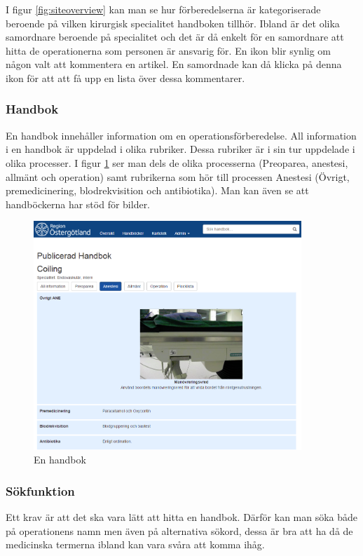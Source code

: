 I figur \ref{fig:siteoverview} kan man se hur förberedelserna är kategoriserade beroende på vilken kirurgisk specialitet handboken tillhör.
Ibland är det olika samordnare beroende på specialitet och det är då enkelt för en samordnare att hitta de operationerna som personen är ansvarig för.
En ikon blir synlig om någon valt att kommentera en artikel. En samordnade kan då klicka på denna ikon för att att få upp en lista över dessa kommentarer.

\subsubsection{Handbok}
En handbok innehåller information om en operationsförberedelse. All information i en handbok är uppdelad i olika rubriker. Dessa rubriker är i sin tur uppdelade i olika processer.
I figur \ref{fig:handbok} ser man dels de olika processerna (Preoparea, anestesi, allmänt och operation) samt rubrikerna som hör till processen Anestesi (Övrigt, premedicinering, blodrekvisition och  antibiotika). Man kan även se att handböckerna har stöd för bilder.

\begin{figure}[H]
  \centering
  \includegraphics[width=0.9\textwidth]{images/site/handbok.png}
  \caption{En handbok}
  \label{fig:handbok}
\end{figure}



\subsubsection{Sökfunktion}
Ett krav är att det ska vara lätt att hitta en handbok.
Därför kan man söka både på operationens namn men även på alternativa sökord, dessa är bra att ha då de medicinska termerna ibland kan vara svåra att komma ihåg.


